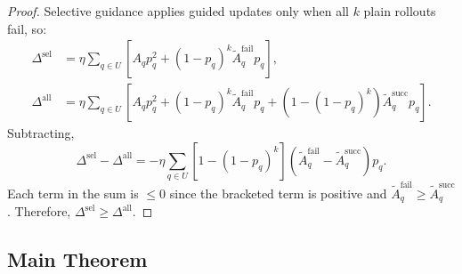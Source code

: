 \documentclass{article}
\newtheorem{theorem}{Theorem}
\newtheorem{proof}{Proof}
\begin{document}
{\begin{proof}
Selective guidance applies guided updates only when all $k$ plain rollouts fail, so:
\begin{align}
\Delta^{\text{sel}} &= \eta \sum_{q \in U} \left[ A_q p_q^2 + (1 - p_q)^k \tilde A_q^{\text{fail}} p_q \right], \\
\Delta^{\text{all}} &= \eta \sum_{q \in U} \left[ A_q p_q^2 + (1 - p_q)^k \tilde A_q^{\text{fail}} p_q + \left(1 - (1 - p_q)^k\right) \tilde A_q^{\text{succ}} p_q \right].
\end{align}
Subtracting,
\begin{equation}
\Delta^{\text{sel}} - \Delta^{\text{all}} = - \eta \sum_{q \in U} \left[1 - (1 - p_q)^k \right] \left( \tilde A_q^{\text{fail}} - \tilde A_q^{\text{succ}} \right) p_q.
\end{equation}
Each term in the sum is $\le 0$ since the bracketed term is positive and $\tilde A_q^{\text{fail}} \ge \tilde A_q^{\text{succ}}$. Therefore, $\Delta^{\text{sel}} \ge \Delta^{\text{all}}$.
\end{proof}



\subsection{Main Theorem}


}
\end{document}
